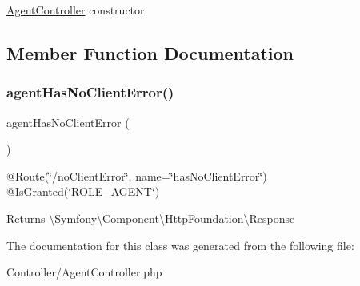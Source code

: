 \mbox{\hyperlink{class_app_1_1_controller_1_1_agent_controller}{Agent\+Controller}} constructor. 

\subsection{Member Function Documentation}
\mbox{\label{class_app_1_1_controller_1_1_agent_controller_add4a55ab0d4320e648f20eeaf9e16879}} 
\subsubsection{\texorpdfstring{agentHasNoClientError()}{agentHasNoClientError()}}
{\footnotesize\ttfamily agent\+Has\+No\+Client\+Error (\begin{DoxyParamCaption}{ }\end{DoxyParamCaption})}

@\+Route(\char`\"{}/no\+Client\+Error\char`\"{}, name=\char`\"{}has\+No\+Client\+Error\char`\"{}) @\+Is\+Granted(\char`\"{}\+R\+O\+L\+E\+\_\+\+A\+G\+E\+N\+T\char`\"{}) \begin{DoxyReturn}{Returns}
\textbackslash{}\+Symfony\textbackslash{}\+Component\textbackslash{}\+Http\+Foundation\textbackslash{}\+Response 
\end{DoxyReturn}


The documentation for this class was generated from the following file\+:\begin{DoxyCompactItemize}
\item 
Controller/Agent\+Controller.\+php\end{DoxyCompactItemize}
